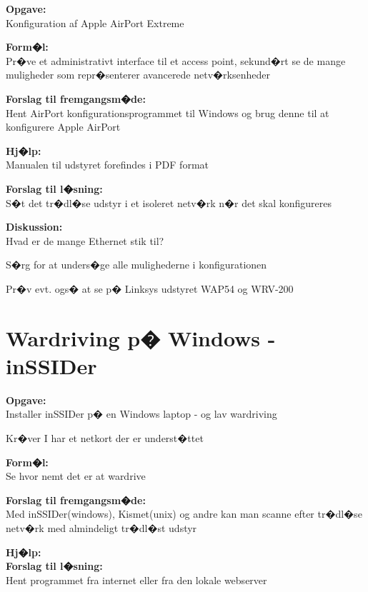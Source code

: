\documentclass[a4paper,11pt,notitlepage]{oevelser}
\begin{document}

{\bfseries Opgave:}\\
Konfiguration af Apple AirPort Extreme

{\bfseries Form�l:}\\
Pr�ve et administrativt interface til et access point, sekund�rt se de mange muligheder som repr�senterer avancerede netv�rksenheder

{\bfseries Forslag til fremgangsm�de:}\\
Hent AirPort konfigurationsprogrammet til Windows og
brug denne til at konfigurere Apple AirPort

{\bfseries Hj�lp:}\\
Manualen til udstyret forefindes i PDF format

{\bfseries Forslag til l�sning:}\\
S�t det tr�dl�se udstyr i et isoleret netv�rk n�r det skal konfigureres

{\bfseries Diskussion:}\\
Hvad er de mange Ethernet stik til?

S�rg for at unders�ge alle mulighederne i konfigurationen

Pr�v evt. ogs� at se p� Linksys udstyret WAP54 og WRV-200


\chapter{Wardriving p� Windows - inSSIDer}
\label{ex:wardriving-windows}


{\bfseries Opgave:}\\
Installer inSSIDer p� en Windows laptop - og lav wardriving

Kr�ver I har et netkort der er underst�ttet

{\bfseries Form�l:}\\
Se hvor nemt det er at wardrive

{\bfseries Forslag til fremgangsm�de:}\\
Med inSSIDer(windows), Kismet(unix) og andre kan man
scanne efter tr�dl�se netv�rk med almindeligt tr�dl�st udstyr

{\bfseries Hj�lp:}\\

{\bfseries Forslag til l�sning:}\\
Hent programmet fra internet eller fra den lokale webserver
\end{document}

